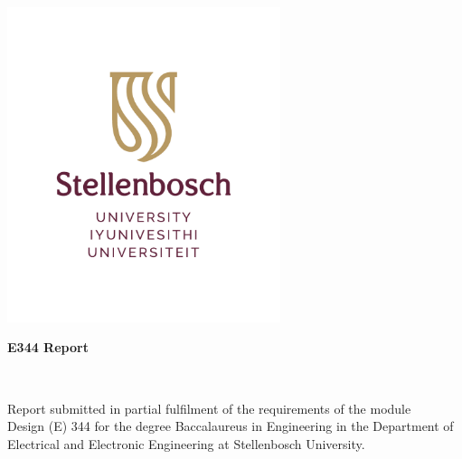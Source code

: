 \graphicspath{{frontmatter/fig/}}

\begin{titlepage}
\begin{center}

\includegraphics[width=8cm]{frontmatter/fig/SU_logo_RGB_without_slogan.pdf}

\vfill

{\sffamily \bfseries \huge E344 Report \par}

\vfill

{\large {\Large \nameFull} \\ \stNumber \par}

\vfill

\vfill

{Report submitted in partial fulfilment of the requirements of the module \\
Design (E) 344 for the degree Baccalaureus in Engineering in the Department of
Electrical and Electronic Engineering at Stellenbosch University. \par}

\vfill


\vfill

{\Large \myDate}
\end{center}
\end{titlepage}
